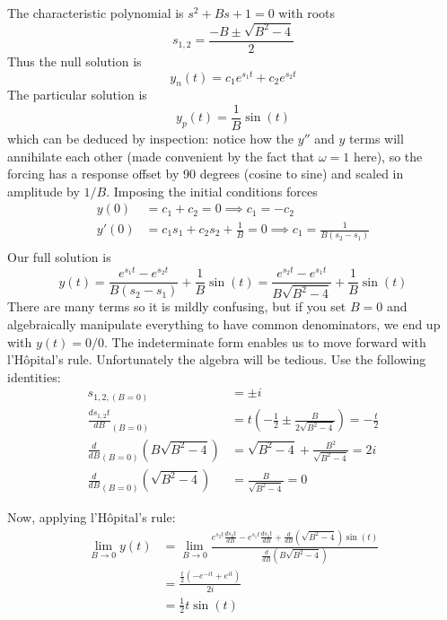 \documentclass[a4paper]{article}
\begin{document}
The characteristic polynomial is \( s^{2} + Bs + 1 = 0 \) with roots
\[
	s_{1,2} = \frac{-B \pm \sqrt{B^{2} - 4}}{2} 
\]
Thus the null solution is
\[
	y_{n } \!\left( t  \right) = c_{1} e^{s_{1}t } + c_{2} e^{s_{2} t } 
\]
The particular solution is
\[
	y_{p } \!\left( t  \right) = \frac{1}{B } \sin\!\left( t \right)  
\]
which can be deduced by inspection: notice how the \( y'' \) and \( y \) terms will annihilate each other (made convenient by the fact that \( \omega = 1 \) here), so the forcing has a response offset by 90 degrees (cosine to sine) and scaled in amplitude by \( 1 / B  \). Imposing the initial conditions forces
\begin{align*}
	y \!\left( 0 \right) & = c_{1} + c_{2} = 0 \implies \boxed{c_{1} = -c_{2}} \\[12pt]
	y'\!\left( 0 \right) & = c_{1}s_{1} + c_{2}s_{2} + \frac{1}{B } = 0 \implies \boxed{c_{1} = \frac{1}{B \!\left( s_{2} - s_{1} \right)}} \\ 
\end{align*}
Our full solution is
\[
	y \!\left( t  \right) = \frac{e^{s_{1}t } - e^{s_{2} t }}{B \!\left( s_{2} - s_{1} \right)} + \frac{1}{B } \sin\!\left( t \right) = \frac{e^{s_{2} t } - e^{s_{1} t }}{B \sqrt{B^{2} - 4}} + \frac{1}{B } \sin\!\left( t \right) 
\]
There are many terms so it is mildly confusing, but if you set \( B = 0 \) and algebraically manipulate everything to have common denominators, we end up with \( y \!\left( t  \right) = 0/0 \). The indeterminate form enables us to move forward with l'H\^opital's rule. Unfortunately the algebra will be tedious. Use the following identities:
\begin{align*}
	s_{1,2, \!\left( B = 0 \right)} & = \boxed{\pm i} \\[12pt]
	\frac{d s_{1,2}t}{d B }_{\!\left( B = 0 \right)} & = t \!\left( -\frac{1}{2} \pm \frac{B }{2 \sqrt{B^{2} - 4}} \right) = \boxed{-\frac{t}{2}} \\[12pt]
	\frac{d }{d B }_{\!\left( B = 0 \right)} \!\left( B \sqrt{B^{2} - 4} \right) & = \sqrt{B^{2} - 4} + \frac{B^{2}}{\sqrt{B^{2} - 4}} = \boxed{2i} \\[12pt]
	\frac{d }{d B }_{\!\left( B = 0 \right)} \!\left( \sqrt{B^{2} - 4} \right) & = \frac{B }{\sqrt{B^{2} - 4}} = \boxed{0}
\end{align*}

Now, applying l'H\^opital's rule:
\begin{align*}
	\lim\limits_{B  \to 0} y \!\left( t  \right) & = \lim\limits_{B  \to 0} \frac{e^{s_{2} t } \frac{d s_{2}t}{d B } - e^{s_{1} t } \frac{d s_{1}t}{d B} + \frac{d }{d B } \!\left( \sqrt{B^{2} - 4} \right) \sin\!\left( t \right) }{\frac{d }{d B } \!\left( B \sqrt{B^{2} - 4} \right)} \\[12pt]
						     & = \frac{\frac{t}{2}\!\left( -e^{-it } + e^{it}\right) }{2i} \\[12pt]
						     & = \frac{1}{2}t \sin\!\left(t\right) 
\end{align*}
\end{document}
